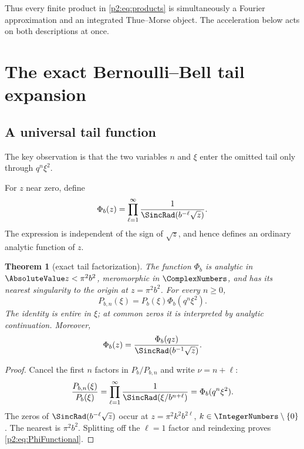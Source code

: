 \documentclass[11pt,oneside]{article}
\numberwithin{equation}{section}
\newtheorem{theorem}{Theorem}[section]
\theoremstyle{definition}
\theoremstyle{remark}
\begin{document}
Thus every finite product in \eqref{p2:eq:products} is simultaneously a Fourier
approximation and an integrated Thue--Morse object. The acceleration below acts
on both descriptions at once.

\section{The exact Bernoulli--Bell tail expansion}
\label{p2:sec:tail}

\subsection{A universal tail function}

The key observation is that the two variables \(n\) and \(\xi\) enter the omitted
tail only through \(q^n\xi^2\).

\begin{definition}
For \(z\) near zero, define
\begin{equation}
 \Phi_b(z)=\prod_{\ell=1}^{\infty}
 \frac1{\SincRad(b^{-\ell}\sqrt z)}.
 \label{p2:eq:PhiDef}
\end{equation}
The expression is independent of the sign of \(\sqrt z\), and hence defines an
ordinary analytic function of \(z\).
\end{definition}

\begin{theorem}[exact tail factorization]
\label{p2:thm:tailfactor}
The function \(\Phi_b\) is analytic in \(\AbsoluteValue z<\pi^2b^2\), meromorphic in
\(\ComplexNumbers\), and has its nearest singularity to the origin at \(z=\pi^2b^2\). For
every \(n\geq0\),
\begin{equation}
 P_{b,n}(\xi)=P_b(\xi)\Phi_b(q^n\xi^2).
 \label{p2:eq:exacttail}
\end{equation}
The identity is entire in \(\xi\); at common zeros it is interpreted by analytic
continuation. Moreover,
\begin{equation}
 \Phi_b(z)=\frac{\Phi_b(qz)}{\SincRad(b^{-1}\sqrt z)}.
 \label{p2:eq:PhiFunctional}
\end{equation}
\end{theorem}

\begin{proof}
Cancel the first \(n\) factors in \(P_b/P_{b,n}\) and write \(\nu=n+\ell\):
\[
 \frac{P_{b,n}(\xi)}{P_b(\xi)}
 =\prod_{\ell=1}^{\infty}
 \frac1{\SincRad(\xi/b^{n+\ell})}
 =\Phi_b(q^n\xi^2).
\]
The zeros of \(\SincRad(b^{-\ell}\sqrt z)\) occur at
\(z=\pi^2k^2b^{2\ell}\), \(k\in\IntegerNumbers\setminus\{0\}\). The nearest is
\(\pi^2b^2\). Splitting off the \(\ell=1\) factor and reindexing proves
\eqref{p2:eq:PhiFunctional}.
\end{proof}
\end{document}
